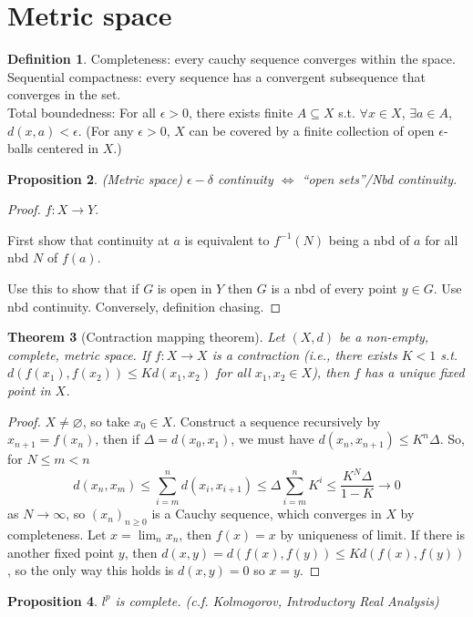 \documentclass{article}
\theoremstyle{definition}
\newtheorem{defn}{Definition}[section]
\theoremstyle{remark}
\theoremstyle{plain}
\newtheorem{thm}[defn]{Theorem}
\newtheorem{prop}[defn]{Proposition}
\theoremstyle{definition}
\begin{document}
\section{Metric space}
\begin{defn}
    Completeness: every cauchy sequence converges within the space.\\
    Sequential compactness: every sequence has a convergent subsequence that converges in the set.\\
    Total boundedness:
    For all $\epsilon>0$, there exists finite $A\subseteq X$ s.t. $\forall x\in X$, $\exists a\in A$, $d(x,a)<\epsilon$. (For any $\epsilon>0$, $X$ can be covered by a finite collection of open $\epsilon$-balls centered in $X$.)
\end{defn}
\begin{prop}
    (Metric space) $\epsilon-\delta$ continuity $\Leftrightarrow$ ``open sets''/Nbd continuity. 
\end{prop}
\begin{proof}
$f:X\to Y$.

    First show that continuity at $a$ is equivalent to $f^{-1}(N)$ being a nbd of $a$ for all nbd $N$ of $f(a)$.

    Use this to show that if $G$ is open in $Y$ then $G$ is a nbd of every point $y\in G$. Use nbd continuity. Conversely, definition chasing.
\end{proof}
\begin{thm}[Contraction mapping theorem]
    Let $(X,d)$ be a non-empty, complete, metric space. If $f:X\to X$ is a contraction (i.e., there exists $K<1$ s.t. $d(f(x_1),f(x_2))\le Kd(x_1,x_2)$ for all $x_1,x_2\in X$), then $f$ has a unique fixed point in $X$.
\end{thm}
\begin{proof}
    $X\neq\varnothing$, so take $x_0\in X$. Construct a sequence recursively by $x_{n+1}=f(x_n)$, then if $\Delta=d(x_0,x_1)$, we must have $d(x_n,x_{n+1})\le K^n\Delta$. So, for $N\le m<n$
    \[d(x_n,x_m)\le\sum_{i=m}^nd(x_i,x_{i+1})\le \Delta\sum_{i=m}^n K^i\le \dfrac{K^N\Delta}{1-K}\to 0\] as $N\to\infty$, so $(x_n)_{n\ge 0}$ is a Cauchy sequence, which converges in $X$ by completeness. Let $x=\lim_{n}x_n$, then $f(x)=x$ by uniqueness of limit.
    If there is another fixed point $y$, then $d(x,y)=d(f(x),f(y))\le Kd(f(x),f(y))$, so the only way this holds is $d(x,y)=0$ so $x=y$.
\end{proof}
\begin{prop}
    $l^p$ is complete. (c.f. Kolmogorov, Introductory Real Analysis)
\end{prop}
\end{document}
